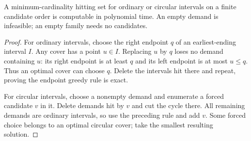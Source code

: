 \begin{lemma}\label{lem:minimum-interval-cover}
A minimum-cardinality hitting set for ordinary or circular intervals
on a finite candidate order is computable in polynomial time.
An empty demand is infeasible; an empty family needs no candidates.
\end{lemma}
\begin{proof}
For ordinary intervals, choose the right endpoint $q$ of an
earliest-ending interval $I$. Any cover has a point $u\in I$.
Replacing $u$ by $q$ loses no demand containing $u$: its right
endpoint is at least $q$ and its left endpoint is at most $u\le q$.
Thus an optimal cover can choose $q$. Delete the intervals hit
there and repeat, proving the endpoint greedy rule is exact.

For circular intervals, choose a nonempty demand and enumerate
a forced candidate $v$ in it. Delete demands hit by $v$ and cut
the cycle there. All remaining demands are ordinary intervals,
so use the preceding rule and add $v$. Some forced choice belongs
to an optimal circular cover; take the smallest resulting solution.
\end{proof}

